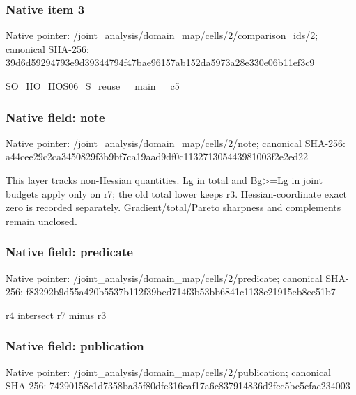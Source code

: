 \documentclass[10pt,a4paper]{article}
\begin{document}
\subsubsection{Native item 3}
Native pointer: /joint\_\allowbreak{}analysis/domain\_\allowbreak{}map/cells/2/comparison\_\allowbreak{}ids/2; canonical SHA-256: 39d6d59294793e9d39344794f47bae96157ab152da5973a28e330e06b11ef3c9

\begingroup\raggedright\sloppy SO\_\allowbreak{}HO\_\allowbreak{}HOS06\_\allowbreak{}S\_\allowbreak{}reuse\_\allowbreak{}\_\allowbreak{}main\_\allowbreak{}\_\allowbreak{}c5\par\endgroup

\subsubsection{Native field: note}
Native pointer: /joint\_\allowbreak{}analysis/domain\_\allowbreak{}map/cells/2/note; canonical SHA-256: a44cee29c2ca3450829f3b9bf7ca19aad9df0c113271305443981003f2e2ed22

\begingroup\raggedright\sloppy This layer tracks non-Hessian quantities. Lg in total and Bg>=\allowbreak{}Lg in joint budgets apply only on r7;\allowbreak{} the old total lower keeps r3. Hessian-coordinate exact zero is recorded separately. Gradient/\allowbreak{}total/\allowbreak{}Pareto sharpness and complements remain unclosed.\par\endgroup

\subsubsection{Native field: predicate}
Native pointer: /joint\_\allowbreak{}analysis/domain\_\allowbreak{}map/cells/2/predicate; canonical SHA-256: f83292b9d55a420b5537b112f39bed714f3b53bb6841c1138e21915eb8ee51b7

\begingroup\raggedright\sloppy r4 intersect r7 minus r3\par\endgroup

\subsubsection{Native field: publication}
Native pointer: /joint\_\allowbreak{}analysis/domain\_\allowbreak{}map/cells/2/publication; canonical SHA-256: 74290158c1d7358ba35f80dfe316caf17a6c837914836d2fec5bc5cfac234003
\end{document}
